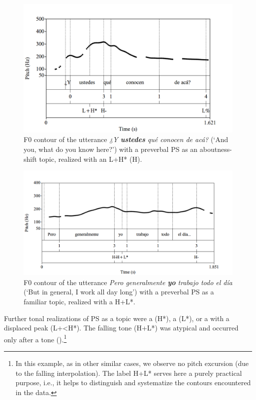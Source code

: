 \documentclass[output=paper]{langsci/langscibook}
\begin{document}
\begin{figure}[p]
\includegraphics[width=\textwidth]{figures/pes-img15.png}
\caption{F0 contour of the utterance \textit{¿Y \textbf{ustedes} qué conocen de acá?} (‘And you, what do you know here?’) with a preverbal PS as an aboutness-shift topic, realized with an L+H* (H\textminus{}).\label{fig:pes:15}}
\end{figure}

\begin{figure}[p]
\includegraphics[width=\textwidth]{figures/pes-img16.png}
\caption{F0 contour of the utterance \textit{Pero generalmente \textbf{yo} trabajo todo el día} (‘But in general, I work all day long’) with a preverbal PS as a familiar topic, realized with a H+L*.\label{fig:pes:16}}
\end{figure}

Further tonal realizations of PS as a topic were a  (H*), a  (L*), or a  with a displaced peak (L+<H*). The falling tone (H+L*) was atypical and occurred only after a  tone ().\footnote{In this example, as in other similar cases, we observe no pitch excursion (due to the falling interpolation). The label H+L* serves here a purely practical purpose, i.e., it helps to distinguish and systematize the contours encountered in the data.}\largerpage[2]
\end{document}
